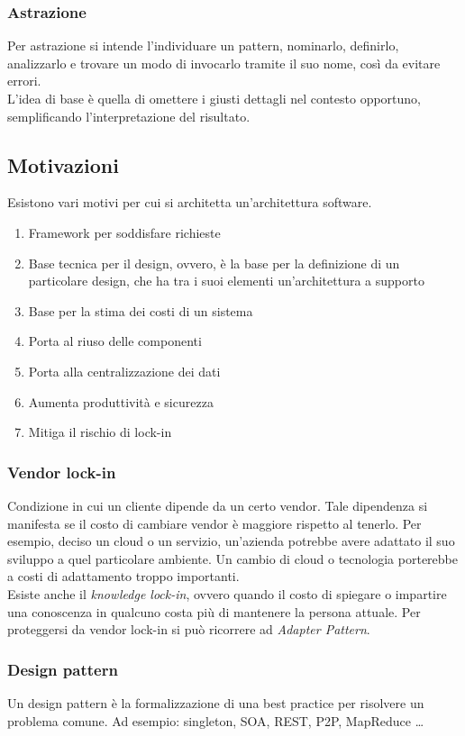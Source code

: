 \subsubsection{Astrazione}
Per astrazione si intende l'individuare un pattern, nominarlo, definirlo, 
analizzarlo e trovare un modo di invocarlo tramite il suo nome, così da evitare
errori.\\
L'idea di base è quella di omettere i giusti dettagli nel contesto opportuno, 
semplificando l'interpretazione del risultato.

\subsection{Motivazioni}

Esistono vari motivi per cui si architetta un'architettura software.
\begin{enumerate}
    \item Framework per soddisfare richieste
    \item Base tecnica per il design, ovvero, è la base per la definizione di un
     particolare design, che ha tra i suoi elementi un'architettura a supporto
    \item Base per la stima dei costi di un sistema
    \item Porta al riuso delle componenti
    \item Porta alla centralizzazione dei dati
    \item Aumenta produttività e sicurezza
    \item Mitiga il rischio di lock-in
\end{enumerate}

\subsubsection{Vendor lock-in}
Condizione in cui un cliente dipende da un certo vendor.
Tale dipendenza si manifesta se il costo di cambiare vendor è maggiore rispetto al 
tenerlo. Per esempio, deciso un cloud o un servizio, un'azienda potrebbe avere 
adattato il suo sviluppo a quel particolare ambiente. Un cambio di 
cloud o tecnologia porterebbe a costi di adattamento troppo importanti.\\
Esiste anche il \emph{knowledge lock-in}, ovvero quando il costo di spiegare o impartire 
una conoscenza in qualcuno costa più di mantenere la persona attuale.
Per proteggersi da vendor lock-in si può ricorrere ad \emph{Adapter Pattern}.

\subsubsection{Design pattern}
Un design pattern è la formalizzazione di una best practice per risolvere un
problema comune.
Ad esempio: singleton, SOA, REST, P2P, MapReduce \dots

